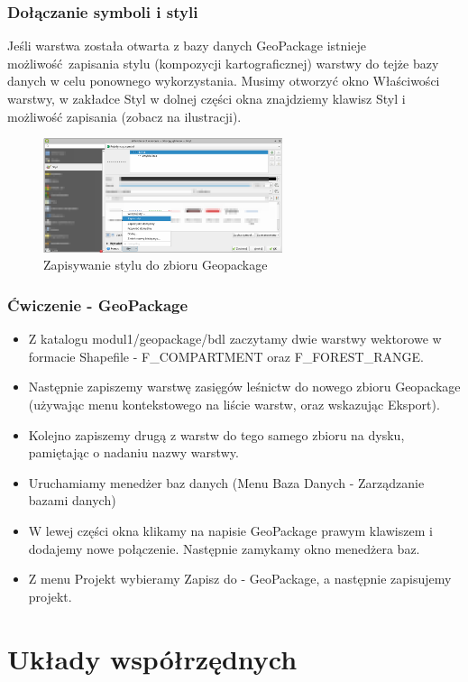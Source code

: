 \documentclass[a4paper,11pt, onecolumn, openany]{memoir}
\begin{document}
			\subsection{Dołączanie symboli i styli}
			Jeśli warstwa została otwarta z bazy danych GeoPackage istnieje możliwość zapisania stylu (kompozycji kartograficznej) warstwy do tejże bazy danych w celu ponownego wykorzystania. Musimy otworzyć okno Właściwości warstwy, w zakładce Styl w dolnej części okna znajdziemy klawisz Styl i możliwość zapisania (zobacz na ilustracji).
			\begin{figure}[!ht]
				\centering
				\includegraphics[width=7cm]{geopackage-styl}
				\caption{Zapisywanie stylu do zbioru Geopackage}
			\end{figure} 
			\subsection{Ćwiczenie - GeoPackage}
			\begin{itemize}
				\item Z katalogu modul1/geopackage/bdl zaczytamy dwie warstwy wektorowe w formacie Shapefile - F\_COMPARTMENT oraz F\_FOREST\_RANGE. 
				\item Następnie zapiszemy warstwę zasięgów leśnictw do nowego zbioru Geopackage (używając menu kontekstowego na liście warstw, oraz wskazując Eksport).
				\item Kolejno zapiszemy drugą z warstw do tego samego zbioru na dysku, pamiętając o nadaniu nazwy warstwy.
				\item Uruchamiamy menedżer baz danych (Menu Baza Danych - Zarządzanie bazami danych)
				\item W lewej części okna klikamy na napisie GeoPackage prawym klawiszem i dodajemy nowe połączenie. Następnie zamykamy okno menedżera baz.
				\item Z menu Projekt wybieramy Zapisz do - GeoPackage, a następnie zapisujemy projekt.
			\end{itemize}
	\chapter{Układy współrzędnych}
\end{document}
